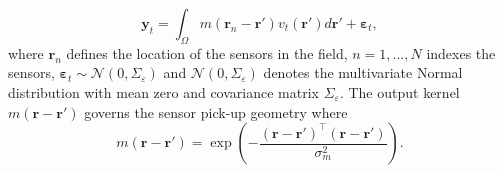 \documentclass[12pt]{iopart}
\begin{document}
\begin{equation}
	\mathbf{y}_t = \int_{\Omega}{m\left(\mathbf{r}_n-\mathbf{r}'\right)v_t\left(\mathbf{r}'\right)d\mathbf{r}'} + \boldsymbol{\varepsilon}_t, 
\end{equation}
where $\mathbf{r}_n$ defines the location of the sensors in the field, $n=1,...,N$ indexes the sensors, $\boldsymbol{\varepsilon}_t \sim \mathcal{N}\left(0,\Sigma_{\varepsilon}\right)$ and $\mathcal{N}\left(0,\Sigma_{\varepsilon}\right)$ denotes the multivariate Normal distribution with mean zero and covariance matrix $\Sigma_{\varepsilon}$. The output kernel $m(\mathbf{r}-\mathbf{r}')$ governs the sensor pick-up geometry where 
\begin{equation}
	m\left(\mathbf{r}-\mathbf{r}'\right) = \exp{\left(-\frac{(\mathbf{r}-\mathbf{r}')^\top(\mathbf{r}-\mathbf{r}')}{\sigma_m^2}\right)}. 
\end{equation}
\end{document}
